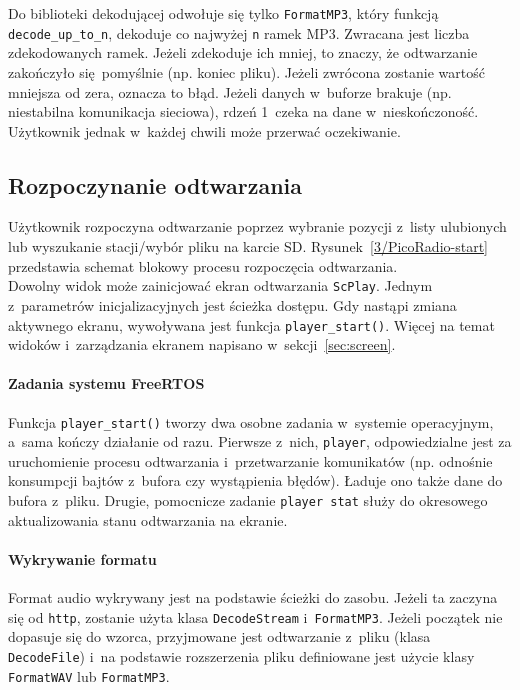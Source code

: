 \documentclass[polish]{aghengthesis}
\begin{document}
			Do biblioteki dekodującej odwołuje się tylko \lstinline|FormatMP3|, który funkcją \lstinline|decode_up_to_n|, dekoduje co najwyżej \lstinline|n| ramek MP3. Zwracana jest liczba zdekodowanych ramek. Jeżeli zdekoduje ich mniej, to znaczy, że odtwarzanie zakończyło się pomyślnie (np. koniec pliku). Jeżeli zwrócona zostanie wartość mniejsza od zera, oznacza to błąd. Jeżeli danych w~buforze brakuje (np. niestabilna komunikacja sieciowa), rdzeń 1~czeka na dane w~nieskończoność. Użytkownik jednak w~każdej chwili może przerwać oczekiwanie.
		
		\subsection{Rozpoczynanie odtwarzania}
			Użytkownik rozpoczyna odtwarzanie poprzez wybranie pozycji z~listy ulubionych lub wyszukanie stacji/wybór pliku na karcie SD.
			Rysunek~\ref{3/PicoRadio-start} przedstawia schemat blokowy procesu rozpoczęcia odtwarzania.
			$ $\\
			
			Dowolny widok może zainicjować ekran odtwarzania \lstinline|ScPlay|.
			Jednym z~parametrów inicjalizacyjnych jest ścieżka dostępu. Gdy nastąpi zmiana aktywnego ekranu, wywoływana jest funkcja \lstinline|player_start()|. Więcej na temat widoków i~zarządzania ekranem napisano w~sekcji~\ref{sec:screen}.
			
			\paragraph{Zadania systemu FreeRTOS}
				Funkcja \lstinline|player_start()| tworzy dwa osobne zadania w~systemie operacyjnym, a~sama kończy działanie od razu. Pierwsze z~nich, \lstinline|player|, odpowiedzialne jest za uruchomienie procesu odtwarzania i~przetwarzanie komunikatów (np. odnośnie konsumpcji bajtów z~bufora czy wystąpienia błędów). Ładuje ono także dane do bufora z~pliku. Drugie, pomocnicze zadanie \lstinline|player stat| służy do okresowego aktualizowania stanu odtwarzania na ekranie.
			
			\paragraph{Wykrywanie formatu}
				Format audio wykrywany jest na podstawie ścieżki do zasobu. Jeżeli ta zaczyna się od \lstinline|http|, zostanie użyta klasa \lstinline|DecodeStream| i~\lstinline|FormatMP3|. Jeżeli początek nie dopasuje się do wzorca, przyjmowane jest odtwarzanie z~pliku (klasa \lstinline|DecodeFile|) i~na podstawie rozszerzenia pliku definiowane jest użycie klasy \lstinline|FormatWAV| lub \lstinline|FormatMP3|.
				
\end{document}
